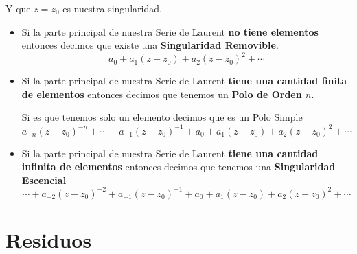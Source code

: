 \documentclass[12pt, fleqn]{report}                             %
\theoremstyle{break}                                            %
\begin{document}
                Y que $z = z_0$ es nuestra singularidad.

                \begin{itemize}
                    \item Si la parte principal de nuestra Serie de Laurent \textbf{no tiene elementos}
                        entonces decimos que existe una \textbf{Singularidad Removible}.
                        \begin{equation*}
                            a_0 + a_1(z-z_0) + a_2(z-z_0)^2 + \cdots
                        \end{equation*}

                    \item Si la parte principal de nuestra Serie de Laurent \textbf{tiene una cantidad
                        finita de elementos} entonces decimos que tenemos un \textbf{Polo de Orden $n$}.

                        Si es que tenemos solo un elemento decimos que es un Polo Simple
                        \begin{equation*}
                            a_{-n}(z - z_0)^{-n} + \cdots + a_{-1}(z - z_0)^{-1} + 
                            a_0 + a_1(z-z_0) + a_2(z-z_0)^2 + \cdots
                        \end{equation*}

                    \item Si la parte principal de nuestra Serie de Laurent \textbf{tiene una cantidad
                        infinita de elementos} entonces decimos que tenemos una \textbf{Singularidad
                        Escencial} 
                        \begin{equation*}
                            \cdots + a_{-2}(z - z_0)^{-2} + a_{-1}(z - z_0)^{-1} +
                            a_0 + a_1(z-z_0) + a_2(z-z_0)^2 + \cdots
                        \end{equation*}
                \end{itemize}







    \chapter{Residuos} 
        \clearpage
\end{document}
